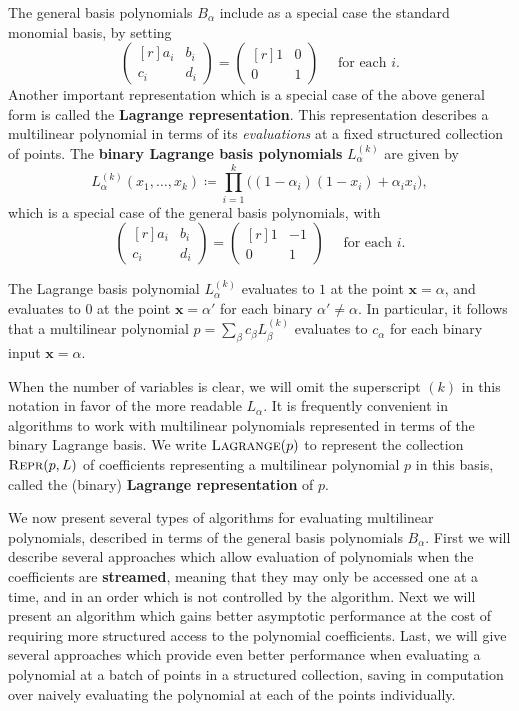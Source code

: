 \documentclass[12pt]{article}
\theoremstyle{plain}
\theoremstyle{definition}
\newcommand{\defn}[1]{\textbf{#1}}
\newcommand{\defeq}{\coloneqq}                %
\newcommand{\matr}[1]{{\begin{pmatrix*}[r] #1 \end{pmatrix*}}} %
\newcommand*{\fn}[1]{\textsc{{#1}}}
\renewcommand*{\vec}[1]{{\mathbf{#1}}}
\begin{document}
The general basis polynomials $B_\alpha$ include as a special case the standard monomial basis, by setting
\[
  \matr{a_i & b_i \\ c_i & d_i} = \matr{1 & 0 \\ 0 & 1} \quad \text{ for each $i$.}
\]
Another important representation which is a special case of the above general form is called the \defn{Lagrange representation}.  This representation describes a multilinear polynomial in terms of its \emph{evaluations} at a fixed structured collection of points.  The \defn{binary Lagrange basis polynomials} $L_\alpha^{(k)}$ are given by
\[
  L_\alpha^{(k)}(x_1, \ldots, x_k) \defeq \prod_{i=1}^k \big( (1 - \alpha_i) (1 - x_i) + \alpha_i x_i\big),
\]
which is a special case of the general basis polynomials, with
\[
  \matr{a_i & b_i \\ c_i & d_i} = \matr{1 & -1 \\ 0 & 1} \quad \text{ for each $i$.}
\]

The Lagrange basis polynomial $L_\alpha^{(k)}$ evaluates to $1$ at the point $\vec{x} = \alpha$, and evaluates to $0$ at the point $\vec{x} = \alpha'$ for each binary $\alpha' \neq \alpha$.  In particular, it follows that a multilinear polynomial $p = \sum_\beta c_{\beta} L_\beta^{(k)}$ evaluates to $c_\alpha$ for each binary input $\vec{x} = \alpha$.

When the number of variables is clear, we will omit the superscript $(k)$ in this notation in favor of the more readable $L_\alpha$.  It is frequently convenient in algorithms to work with multilinear polynomials represented in terms of the binary Lagrange basis.  We write $\fn{Lagrange}(p)$ to represent the collection $\fn{Repr}(p, L)$ of coefficients representing a multilinear polynomial $p$ in this basis, called the (binary) \defn{Lagrange representation} of $p$.

We now present several types of algorithms for evaluating multilinear polynomials, described in terms of the general basis polynomials $B_\alpha$.  First we will describe several approaches which allow evaluation of polynomials when the coefficients are \defn{streamed}, meaning that they may only be accessed one at a time, and in an order which is not controlled by the algorithm.  Next we will present an algorithm which gains better asymptotic performance at the cost of requiring more structured access to the polynomial coefficients.  Last, we will give several approaches which provide even better performance when evaluating a polynomial at a batch of points in a structured collection, saving in computation over naively evaluating the polynomial at each of the points individually.
\end{document}
